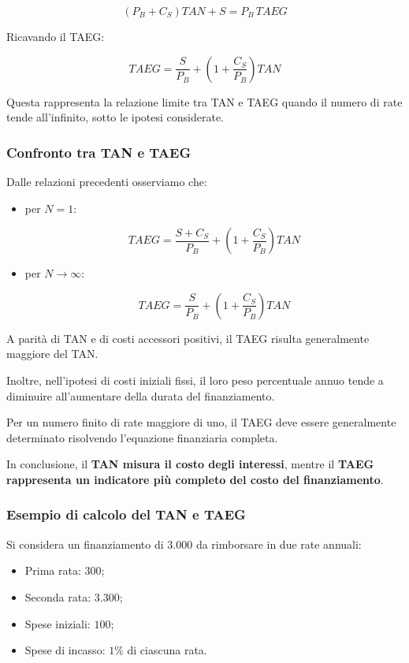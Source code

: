 \[
(P_B+C_S)TAN+S=P_B\,TAEG
\]

\noindent Ricavando il TAEG:

\[
\boxed{
TAEG=
\frac{S}{P_B}
+
\left(1+\frac{C_S}{P_B}\right)TAN
}
\]

\noindent Questa rappresenta la relazione limite
tra TAN e TAEG quando il numero di rate tende
all'infinito, sotto le ipotesi considerate.

\subsubsection*{Confronto tra TAN e TAEG}

\noindent Dalle relazioni precedenti osserviamo che:

\begin{itemize}
    \item per $N=1$:

    \[
    TAEG=
    \frac{S+C_S}{P_B}
    +
    \left(1+\frac{C_S}{P_B}\right)TAN
    \]

    \item per $N\to\infty$:

    \[
    TAEG=
    \frac{S}{P_B}
    +
    \left(1+\frac{C_S}{P_B}\right)TAN
    \]
\end{itemize}

\noindent A parità di TAN e di costi accessori positivi,
il TAEG risulta generalmente maggiore del TAN.

\medskip

\noindent Inoltre, nell'ipotesi di costi iniziali fissi,
il loro peso percentuale annuo tende a diminuire
all'aumentare della durata del finanziamento.

\medskip

\noindent Per un numero finito di rate maggiore di uno,
il TAEG deve essere generalmente determinato
risolvendo l'equazione finanziaria completa.

\medskip

\noindent In conclusione, il \textbf{TAN misura il costo
degli interessi}, mentre il \textbf{TAEG rappresenta
un indicatore più completo del costo del finanziamento}.
\subsubsection*{Esempio di calcolo del TAN e TAEG}

\noindent Si considera un finanziamento di $3.000$ da rimborsare in due rate annuali:

\begin{itemize}
    \item Prima rata: $300$;
    \item Seconda rata: $3.300$;
    \item Spese iniziali: $100$;
    \item Spese di incasso: $1\%$ di ciascuna rata.
\end{itemize}

